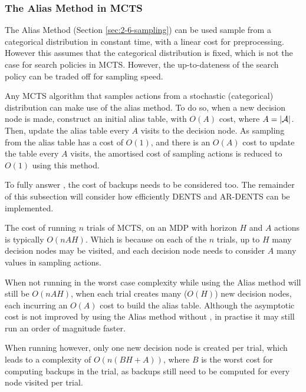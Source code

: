         \subsubsection{The Alias Method in MCTS}


        The Alias Method (Section \ref{sec:2-6-sampling}) can be used sample from a categorical distribution in constant time, with a linear cost for preprocessing. However this assumes that the categorical distribution is fixed, which is not the case for search policies in MCTS. However, the up-to-dateness of the search policy can be traded off for sampling speed. 

        Any MCTS algorithm that samples actions from a stochastic (categorical) distribution can make use of the alias method. To do so, when a new decision node is made, construct an initial alias table, with $O(A)$ cost, where $A=|\mathcal{A}|$. Then, update the alias table every $A$ visits to the decision node. As sampling from the alias table has a cost of $O(1)$, and there is an $O(A)$ cost to update the table every $A$ visits, the amortised cost of sampling actions is reduced to $O(1)$ using this method.

        To fully answer \complexityq, the cost of backups needs to be considered too. The remainder of this subsection will consider how efficiently DENTS and AR-DENTS can be implemented.

        The cost of running $n$ trials of MCTS, on an MDP with horizon $H$ and $A$ actions is typically $O(nAH)$. Which is because on each of the $n$ trials, up to $H$ many decision nodes may be visited, and each decision node needs to consider $A$ many values in sampling actions. 
        
        When not running in \mctsmode\ewe the worst case complexity while using the Alias method will still be $O(nAH)$, when each trial creates many ($O(H)$) new decision nodes, each incurring an $O(A)$ cost to build the alias table. Although the asymptotic cost is not improved by using the Alias method without \mctsmode, in practise it may still run an order of magnitude faster.

        When running \mctsmode\ewe however, only one new decision node is created per trial, which leads to a complexity of $O(n(BH+A))$, where $B$ is the worst cost for computing backups in the trial, as backups still need to be computed for every node visited per trial.  


